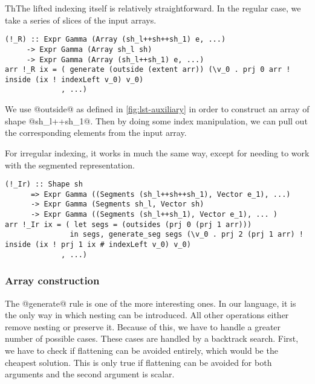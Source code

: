 ThThe lifted indexing itself is relatively straightforward. In the regular case, we take a series of slices of the input arrays.
%
\begin{lstlisting}[style=ndp]
(!_R) :: Expr Gamma (Array (sh_l++sh++sh_1) e, ...)
     -> Expr Gamma (Array sh_l sh)
     -> Expr Gamma (Array (sh_l++sh_1) e, ...)
arr !_R ix = ( generate (outside (extent arr)) (\v_0 . prj 0 arr ! inside (ix ! indexLeft v_0) v_0)
             , ...)
\end{lstlisting}
%
We use @outside@ as defined in \ref{fig:lst-auxiliary} in order to construct an array of shape @sh_l++sh_1@. Then by doing some index manipulation, we can pull out the corresponding elements from the input array.

For irregular indexing, it works in much the same way, except for needing to work with the segmented representation.
%
\begin{lstlisting}[style=ndp]
(!_Ir) :: Shape sh
      => Expr Gamma ((Segments (sh_l++sh++sh_1), Vector e_1), ...)
      -> Expr Gamma (Segments sh_l, Vector sh)
      -> Expr Gamma ((Segments (sh_l++sh_1), Vector e_1), ... )
arr !_Ir ix = ( let segs = (outsides (prj 0 (prj 1 arr)))
               in segs, generate_seg segs (\v_0 . prj 2 (prj 1 arr) ! inside (ix ! prj 1 ix # indexLeft v_0) v_0)
             , ...)
\end{lstlisting}

\subsubsection{Array construction}
The @generate@ rule is one of the more interesting ones. In our language, it is the only way in which nesting can be introduced. All other operations either remove nesting or preserve it. Because of this, we have to handle a greater number of possible cases. These cases are handled by a backtrack search. First, we have to check if flattening can be avoided entirely, which would be the cheapest solution. This is only true if flattening can be avoided for both arguments and the second argument is scalar.

